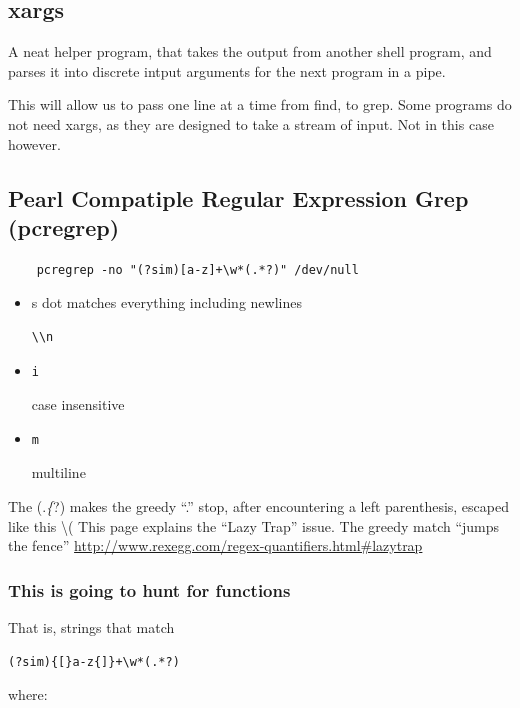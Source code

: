 \documentclass{article}
\begin{document}
\subsection{xargs}\label{xargs}

A neat helper program, that takes the output from another shell program,
and parses it into discrete intput arguments for the next program in a
pipe.

This will allow us to pass one line at a time from find, to grep. Some
programs do not need xargs, as they are designed to take a stream of
input. Not in this case however.

\subsection{Pearl Compatiple Regular Expression Grep (pcregrep)}

\begin{Verbatim}
    pcregrep -no "(?sim)[a-z]+\w*(.*?)" /dev/null
\end{Verbatim}

\begin{itemize}
\itemsep1pt\parskip0pt
\item
    s dot matches everything including newlines\begin{verbatim}\\n\end{verbatim}
\item
    \begin{verbatim}i\end{verbatim} case insensitive
\item
 \begin{verbatim}m\end{verbatim}  multiline
\end{itemize}

The (.\emph\{?) makes the greedy ``.'' stop, after encountering a left
    parenthesis, escaped like this \textbackslash{}( This page explains the
    ``Lazy Trap'' issue. The greedy match ``jumps the fence''
    \url{http://www.rexegg.com/regex-quantifiers.html\#lazytrap}

\subsubsection{This is going to hunt for
functions}\label{this-is-going-to-hunt-for-functions}

That is, strings that match\begin{verbatim}(?sim){[}a-z{]}+\w*(.*?)\end{verbatim} where:
\end{document}
